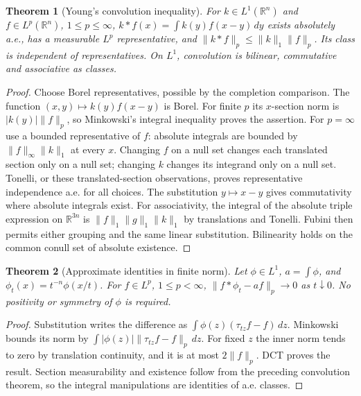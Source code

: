 \documentclass[11pt,oneside,openany]{book}
\newtheorem{theorem}{Theorem}[chapter]
\theoremstyle{definition}
\theoremstyle{remark}
\newcommand{\R}{\mathbb R}\newcommand{\C}{\mathbb C}
\newcommand{\family}[1]{}
\begin{document}
\begin{theorem}[Young's convolution inequality]\family{D11.11.convolution_young}\label{d11:11:convolution-young}
For $k\in L^1(\R^n)$ and $f\in L^p(\R^n)$, $1\leq p\leq\infty$,
$k*f(x)=\int k(y)f(x-y)\,dy$ exists absolutely a.e., has a measurable
$L^p$ representative, and $\|k*f\|_p\leq\|k\|_1\|f\|_p$.
Its class is independent of representatives. On $L^1$, convolution is
bilinear, commutative and associative as classes.
\end{theorem}
\begin{proof}
Choose Borel representatives, possible by the completion comparison.
The function $(x,y)\mapsto k(y)f(x-y)$ is Borel. For finite $p$ its
$x$-section norm is $|k(y)|\|f\|_p$, so Minkowski's integral inequality
proves the assertion. For $p=\infty$ use a bounded representative of $f$:
absolute integrals are bounded by $\|f\|_\infty\|k\|_1$ at every $x$.
Changing $f$ on a null set changes each translated section only on a null
set; changing $k$ changes its integrand only on a null set. Tonelli, or
these translated-section observations, proves representative independence
a.e. for all choices. The substitution $y\mapsto x-y$ gives commutativity
where absolute integrals exist. For associativity, the integral of the
absolute triple expression on $\R^{3n}$ is
$\|f\|_1\|g\|_1\|k\|_1$ by translations and Tonelli. Fubini then
permits either grouping and the same linear substitution. Bilinearity
holds on the common conull set of absolute existence.
\end{proof}

\begin{theorem}[Approximate identities in finite norm]\family{D11.11.approximate_identity_lp}\label{d11:11:approximate-identity-lp}
Let $\phi\in L^1$, $a=\int\phi$, and
$\phi_t(x)=t^{-n}\phi(x/t)$. For $f\in L^p$, $1\leq p<\infty$,
$\|f*\phi_t-af\|_p\to0$ as $t\downarrow0$. No positivity or symmetry
of $\phi$ is required.
\end{theorem}
\begin{proof}
Substitution writes the difference as
$\int\phi(z)(\tau_{tz}f-f)\,dz$. Minkowski bounds its norm by
$\int|\phi(z)|\|\tau_{tz}f-f\|_p\,dz$.
For fixed $z$ the inner norm tends to zero by translation continuity,
and it is at most $2\|f\|_p$. DCT proves the result. Section measurability
and existence follow from the preceding convolution theorem, so the
integral manipulations are identities of a.e. classes.
\end{proof}
\end{document}
